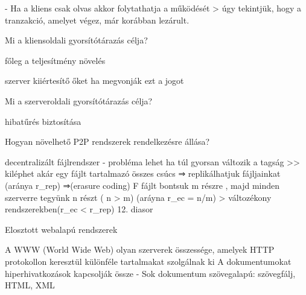 \documentclass[twoside, a4paper, 12pt]{article}
\begin{document}
\begin{description}
                                                                        - Ha a kliens csak olvas akkor folytathatja a működését 
                                                                        > úgy tekintjük, hogy a tranzakció, amelyet végez, már korábban lezárult.	
                                                                    \item  Mi a kliensoldali gyorsítótárazás célja?
                                                                    \item főleg a teljesítmény növelés
                                                                    \item szerver kiiértesítő őket ha megvonják ezt a jogot
                                                                    \item  Mi a szerveroldali gyorsítótárazás célja?
                                                                    \item hibatűrés biztosítása
                                                                    \item  Hogyan növelhető P2P rendszerek rendelkezésre állása?
                                                                    \item decentralizált fájlrendszer
                                                                        - probléma lehet ha túl gyorsan változik a tagság >> kiléphet akár egy fájlt tartalmazó összes csúcs
                                                                        ⇒ replikálhatjuk fájljainkat (aránya r\_rep)
                                                                        ⇒(erasure coding) F fájlt bontsuk m részre , majd minden szerverre
                                                                        tegyünk n részt ( n > m) (aráyna r\_ec = n/m) 
                                                                        > változékony rendszerekben(r\_ec < r\_rep)
                                                                        12. diasor
                                                                    \item  Elosztott webalapú rendszerek
                                                                    \item A WWW (World Wide Web) olyan szerverek összessége, amelyek HTTP protokollon keresztül különféle tartalmakat szolgálnak ki
                                                                        A dokumentumokat hiperhivatkozások kapcsolják össze
                                                                        - Sok dokumentum szövegalapú: szövegfálj, HTML, XML

\end{description}
\end{document}
